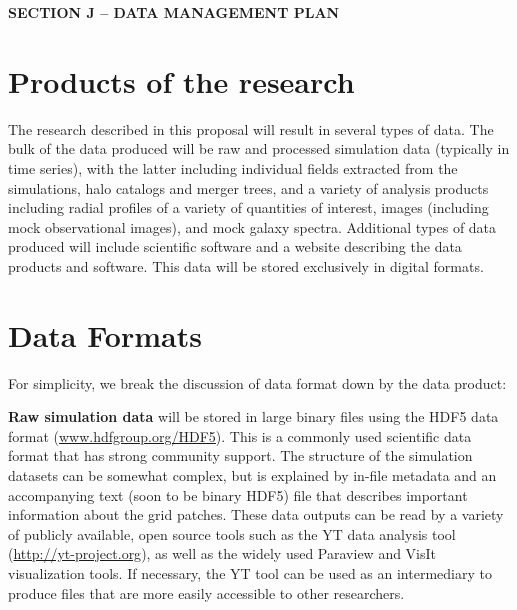 \documentclass[11pt]{article}
\begin{document}

\vspace{-6mm}
\begin{center} 
\bfseries\uppercase{Section J -- data management plan}
\end{center}

\vspace{-3mm}
\section{Products of the research}
\vspace{-2mm}

The research described in this proposal will result in several types
of data.  The bulk of the data produced will be raw and processed
simulation data (typically in time series), with the latter including
individual fields extracted from the simulations, halo catalogs and
merger trees, and a variety of analysis products including radial
profiles of a variety of quantities of interest, images (including
mock observational images), and mock galaxy spectra.  Additional types
of data produced will include scientific software and a website
describing the data products and software.  This data will be stored
exclusively in digital formats.
 
\vspace{-3mm}
\section{Data Formats}
\vspace{-2mm}

For simplicity, we break the discussion of data format down by the
data product:

\vspace{2mm}
\noindent \textbf{Raw simulation data} will be stored in large binary
files using the HDF5 data format (\url{www.hdfgroup.org/HDF5}).  This
is a commonly used scientific data format that has strong community
support.  The structure of the simulation datasets can be somewhat
complex, but is explained by in-file metadata and an accompanying text
(soon to be binary HDF5) file that describes important information
about the grid patches.  These data outputs can be read by a variety
of publicly available, open source tools such as the YT data analysis
tool (\url{http://yt-project.org}), as well as the widely used Paraview and
VisIt visualization tools.  If necessary, the YT tool can be used as
an intermediary to produce files that are more easily accessible to
other researchers.
\end{document}
